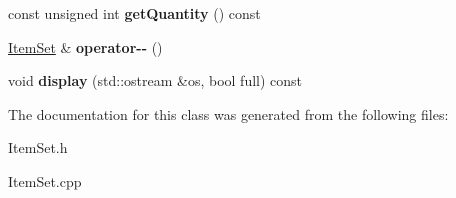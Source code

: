 \begin{DoxyCompactItemize}
const unsigned int {\bfseries get\+Quantity} () const
\item 
\mbox{\label{classsict_1_1ItemSet_a539f3dee79de277f30f6ebcf8453b25f}} 
\mbox{\hyperlink{classsict_1_1ItemSet}{Item\+Set}} \& {\bfseries operator-\/-\/} ()
\item 
\mbox{\label{classsict_1_1ItemSet_af3328f8127c80b02ce738f27a7881635}} 
void {\bfseries display} (std\+::ostream \&os, bool full) const
\end{DoxyCompactItemize}


The documentation for this class was generated from the following files\+:\begin{DoxyCompactItemize}
\item 
Item\+Set.\+h\item 
Item\+Set.\+cpp\end{DoxyCompactItemize}
